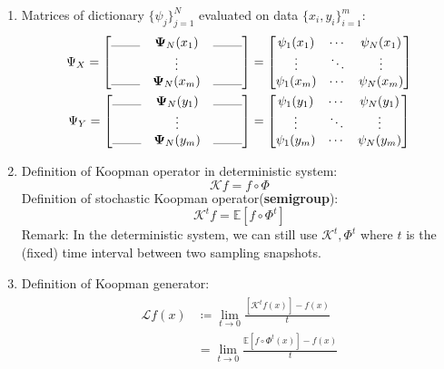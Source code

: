 \documentclass{article}[11]
\begin{document}
\begin{enumerate}
	\item Matrices of dictionary $\{\psi_j\}_{j=1}^N$ evaluated on data $\{x_i, y_i\}_{i=1}^m$:
	\begin{gather*}
		\Psi_X = \begin{bmatrix}
			\rule{0.8cm}{0.1mm} & \mathbf{\Psi}_N(x_1) & \rule{0.8cm}{0.1mm} \\
			& \vdots &   \\
			\rule{0.8cm}{0.1mm} & \mathbf{\Psi}_N(x_m) & \rule{0.8cm}{0.1mm}
		\end{bmatrix}
		=\begin{bmatrix}
			\psi_1(x_1) & \cdots & \psi_{N}(x_1) \\
			\vdots & \ddots & \vdots \\
			\psi_1(x_m) & \cdots & \psi_{N}(x_m)
		\end{bmatrix} \\
		\Psi_Y = \begin{bmatrix}
			\rule{0.8cm}{0.1mm} & \mathbf{\Psi}_N(y_1) & \rule{0.8cm}{0.1mm} \\
			& \vdots &   \\
			\rule{0.8cm}{0.1mm} & \mathbf{\Psi}_N(y_m) & \rule{0.8cm}{0.1mm}
		\end{bmatrix}
		= \begin{bmatrix}
			\psi_1(y_1) & \cdots & \psi_{N}(y_1) \\
			\vdots & \ddots & \vdots \\
			\psi_1(y_m) & \cdots & \psi_{N}(y_m)
		\end{bmatrix}
	\end{gather*}
		
	\item Definition of Koopman operator in deterministic system:
	$$\mathcal{K}f = f\circ\Phi$$
	Definition of stochastic Koopman operator(\textbf{semigroup}):
	$$\mathcal{K}^{t}f = \mathbb{E}[f\circ\Phi^{t}]$$
	Remark: In the deterministic system, we can still use $\mathcal{K}^t,\Phi^t$ where $t$ is the (fixed) time interval between two sampling snapshots.
	\item Definition of Koopman generator:
	\begin{gather}\label{def_generator}
		\begin{aligned}
			\mathcal{L}f(x) &\coloneqq \lim_{t \to 0} \frac{[\mathcal{K}^{t}f(x)] - f(x)}{t} \\
			&= \lim_{t \to 0} \frac{\mathbb{E}[f\circ\Phi^{t}(x)] - f(x)}{t}
		\end{aligned}
	\end{gather}
	
\end{enumerate}
\end{document}
